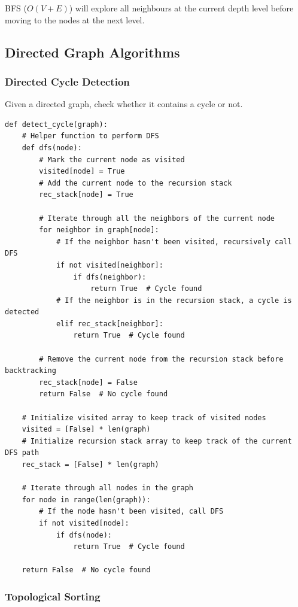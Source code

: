 \documentclass{article}
\begin{document}
BFS ($O(V + E)$) will explore all neighbours at the current depth level before moving to the nodes at the next level.

\subsection{Directed Graph Algorithms}

\subsubsection{Directed Cycle Detection}

Given a directed graph, check whether it contains a cycle or not.

\begin{verbatim}
def detect_cycle(graph):
    # Helper function to perform DFS
    def dfs(node):
        # Mark the current node as visited
        visited[node] = True
        # Add the current node to the recursion stack
        rec_stack[node] = True

        # Iterate through all the neighbors of the current node
        for neighbor in graph[node]:
            # If the neighbor hasn't been visited, recursively call DFS
            if not visited[neighbor]:
                if dfs(neighbor):
                    return True  # Cycle found
            # If the neighbor is in the recursion stack, a cycle is detected
            elif rec_stack[neighbor]:
                return True  # Cycle found

        # Remove the current node from the recursion stack before backtracking
        rec_stack[node] = False
        return False  # No cycle found

    # Initialize visited array to keep track of visited nodes
    visited = [False] * len(graph)
    # Initialize recursion stack array to keep track of the current DFS path
    rec_stack = [False] * len(graph)

    # Iterate through all nodes in the graph
    for node in range(len(graph)):
        # If the node hasn't been visited, call DFS
        if not visited[node]:
            if dfs(node):
                return True  # Cycle found

    return False  # No cycle found
\end{verbatim}

\subsubsection{Topological Sorting}
\end{document}
